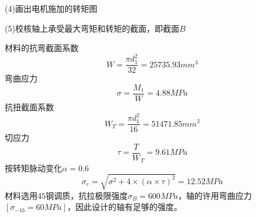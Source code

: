(4)画出电机施加的转矩图

(5)校核轴上承受最大弯矩和转矩的截面，即截面$B$

材料的抗弯截面系数
\[
    W=\frac{\pi d_1^2}{32}=25735.93mm^3
\]
弯曲应力
\[
    \sigma = \frac{M_1}{W} =4.88MPa
\]
抗扭截面系数
\[
    W_T=\frac{\pi d_1^2}{16}=51471.85mm^3
\]
切应力
\[
    \tau = \frac{T}{W}_T =9.61MPa
\]
按转矩脉动变化$\alpha =0.6$
\[
    \sigma_e =\sqrt{\sigma^2+4\times (\alpha \times \tau)^2}=12.52MPa
\]
材料选用$45$钢调质，抗拉极限强度$\sigma_B=600MPa$，轴的许用弯曲应力$[\sigma_{-1b}=60MPa]$，因此设计的轴有足够的强度。   
